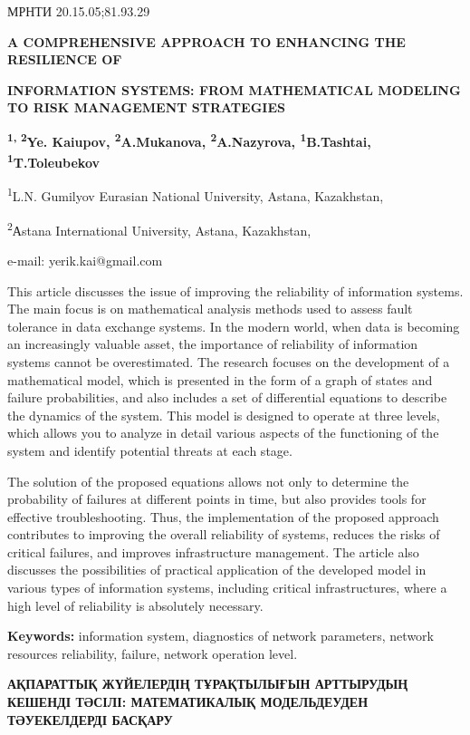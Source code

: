 МРНТИ 20.15.05;81.93.29

\textbf{A COMPREHENSIVE APPROACH TO ENHANCING THE RESILIENCE OF}

\textbf{INFORMATION SYSTEMS: FROM MATHEMATICAL MODELING TO RISK
MANAGEMENT STRATEGIES}

\textbf{\textsuperscript{1, 2}Ye. Kaiupov,
\textsuperscript{2}A.Mukanova, \textsuperscript{2}A.Nazyrova,
\textsuperscript{1}B.Tashtai, \textsuperscript{1}T.Toleubekov}

\textsuperscript{1}L.N. Gumilyov Eurasian National University, Astana,
Kazakhstan,

\textsuperscript{2}Аstana International University, Astana, Kazakhstan,

e-mail: yerik.kai@gmail.com

This article discusses the issue of improving the reliability of
information systems. The main focus is on mathematical analysis methods
used to assess fault tolerance in data exchange systems. In the modern
world, when data is becoming an increasingly valuable asset, the
importance of reliability of information systems cannot be
overestimated. The research focuses on the development of a mathematical
model, which is presented in the form of a graph of states and failure
probabilities, and also includes a set of differential equations to
describe the dynamics of the system. This model is designed to operate
at three levels, which allows you to analyze in detail various aspects
of the functioning of the system and identify potential threats at each
stage.

The solution of the proposed equations allows not only to determine the
probability of failures at different points in time, but also provides
tools for effective troubleshooting. Thus, the implementation of the
proposed approach contributes to improving the overall reliability of
systems, reduces the risks of critical failures, and improves
infrastructure management. The article also discusses the possibilities
of practical application of the developed model in various types of
information systems, including critical infrastructures, where a high
level of reliability is absolutely necessary.

\textbf{Keywords:} information system, diagnostics of network
parameters, network resources reliability, failure, network operation
level.

\textbf{АҚПАРАТТЫҚ ЖҮЙЕЛЕРДІҢ ТҰРАҚТЫЛЫҒЫН АРТТЫРУДЫҢ КЕШЕНДІ ТӘСІЛІ:
МАТЕМАТИКАЛЫҚ МОДЕЛЬДЕУДЕН ТӘУЕКЕЛДЕРДІ БАСҚАРУ}

